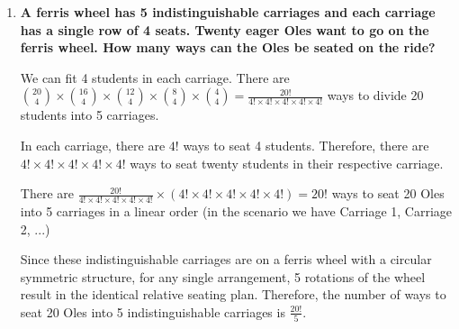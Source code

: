 \documentclass[10pt]{article}
\begin{document}
\begin{enumerate}
\begin{enumerate}
\end{enumerate}
\vskip 1cm


\item
\textbf{A ferris wheel has 5 indistinguishable carriages and each carriage has a single row of 4 seats.  Twenty eager Oles want to go on the ferris wheel.  How many ways can the Oles be seated on the ride?}

We can fit 4 students in each carriage. There are $\binom{20}{4} \times \binom{16}{4} \times \binom{12}{4} \times \binom{8}{4} \times \binom{4}{4} = \frac{20!}{4!\times 4! \times 4! \times 4! \times 4!}$ ways to divide 20 students into 5 carriages.

In each carriage, there are $4!$ ways to seat 4 students. Therefore, there are $4! \times 4! \times 4! \times 4! \times 4!$ ways to seat twenty students in their respective carriage. 

There are $\frac{20!}{4!\times 4! \times 4! \times 4! \times 4!} \times (4! \times 4! \times 4! \times 4! \times 4!) = 20!$ ways to seat 20 Oles into 5 carriages in a linear order (in the scenario we have Carriage 1, Carriage 2, ...)

Since these indistinguishable carriages are on a ferris wheel with a circular symmetric structure, for any single arrangement, 5 rotations of the wheel result in the identical relative seating plan. Therefore, the number of ways to seat 20 Oles into 5 indistinguishable carriages is $\frac{20!}{5}$.

\end{enumerate}
\end{document}
